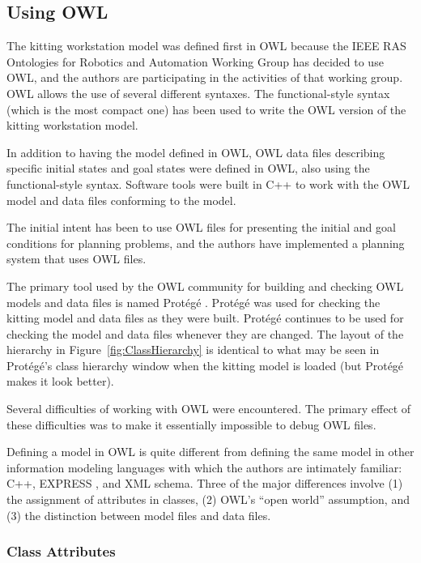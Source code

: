\subsection{Using OWL}

The kitting workstation model was defined first in OWL because the IEEE RAS
Ontologies for Robotics and Automation Working Group has decided to use
OWL, and the authors are participating in the activities of that working
group. OWL allows the use of several different syntaxes. The
functional-style syntax (which is the most compact one) has been used to
write the OWL version of the kitting workstation model.

In addition to having the model defined in OWL, OWL data files describing
specific initial states and goal states were defined in OWL, also using the
functional-style syntax.  Software tools were built in C++ to work with the
OWL model and data files conforming to the model.

The initial intent has been to use OWL files for presenting the initial and
goal conditions for planning problems, and the authors have implemented a
planning system that uses OWL files.

The primary tool used by the OWL community for building and checking OWL
models and data files is named Prot\'{e}g\'{e} \cite{Horridge.2011}.  Prot\'{e}g\'{e} was
used for checking the kitting model and data files as they were
built.  Prot\'{e}g\'{e} continues to be used for checking the model and data files
whenever they are changed. The layout of the hierarchy in
Figure~\ref{fig:ClassHierarchy} is identical to what may be seen in
 Prot\'{e}g\'{e}'s class hierarchy window when the kitting model is loaded (but
 Prot\'{e}g\'{e} makes it look better).

Several difficulties of working with OWL were encountered. The primary
effect of these difficulties was to make it essentially impossible to
debug OWL files.

Defining a model in OWL is quite different from defining the same model in
other information modeling languages with which the authors are intimately
familiar: C++, EXPRESS \cite{EXPRESSmanual}, and XML schema. Three of the
major differences involve (1) the assignment of attributes in classes, (2)
OWL's ``open world'' assumption, and (3) the distinction between model
files and data files.\\

\subsubsection{Class Attributes}

